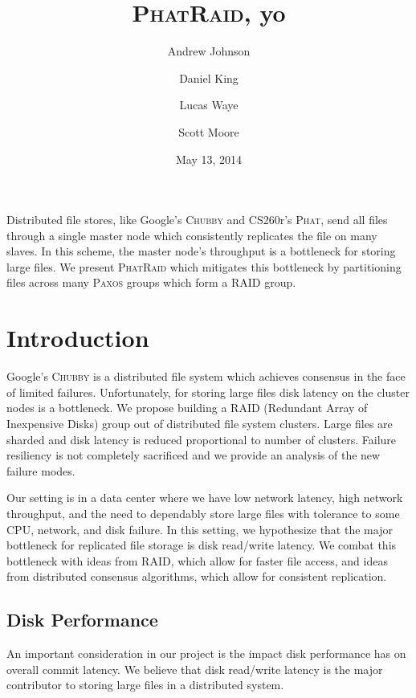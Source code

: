 \documentclass[10pt,letter]{article}
\newcommand{\chubby}[0]{\textsc{Chubby}}
\newcommand{\phat}[0]{\textsc{Phat}}
\newcommand{\phatraid}[0]{\textsc{PhatRaid}}
\newcommand{\raid}[1]{\textsc{RAID #1}}
\newcommand{\paxos}[0]{\textsc{Paxos}}
\begin{document}
\title{\phatraid, yo}
\author{Andrew Johnson \and Daniel King \and Lucas Waye \and Scott Moore}
\date{May 13, 2014}

\maketitle

Distributed file stores, like Google's \chubby{}\cite{burrows-chubby}
and CS260r's \phat{}\cite{class}, send all files through a single
master node which consistently replicates the file on many slaves. In
this scheme, the master node's throughput is a bottleneck for storing
large files. We present \phatraid{} which mitigates this bottleneck by
partitioning files across many \paxos{} groups which form a \raid{}\cite{raid}
group.

\section{Introduction}

Google's \chubby{}\cite{burrows-chubby} is a distributed file system which
achieves consensus in the face of limited failures. Unfortunately, for storing
large files disk latency on the cluster nodes is a bottleneck. We propose
building a RAID (Redundant Array of Inexpensive Disks)\cite{raid} group out of distributed file system clusters. Large files are
sharded and disk latency is reduced proportional to number of clusters. Failure
resiliency is not completely sacrificed and we provide an analysis of the
new failure modes.

Our setting is in a data center where we have low network latency, high network
throughput, and the need to dependably store large files with tolerance to some CPU,
network, and disk failure. In this setting, we hypothesize that the major bottleneck
for replicated file storage is disk read/write latency. We combat this
bottleneck with ideas from RAID, which allow for faster file access, and ideas
from distributed consensus algorithms, which allow for consistent replication.

\subsection{Disk Performance}

An important consideration in our project is the impact disk performance has on overall commit latency. We believe that disk read/write latency is the major contributor to storing large files in a distributed system.
\end{document}
